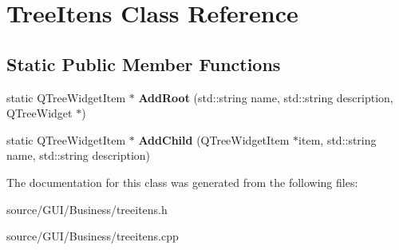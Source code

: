 \section{Tree\+Itens Class Reference}
\label{class_tree_itens}
\subsection*{Static Public Member Functions}
\begin{DoxyCompactItemize}
\item 
static Q\+Tree\+Widget\+Item $\ast$ {\bfseries Add\+Root} (std\+::string name, std\+::string description, Q\+Tree\+Widget $\ast$)\label{class_tree_itens_a37c583b5c2dd4c0adc8a4dd8bf4edada}

\item 
static Q\+Tree\+Widget\+Item $\ast$ {\bfseries Add\+Child} (Q\+Tree\+Widget\+Item $\ast$item, std\+::string name, std\+::string description)\label{class_tree_itens_ae8d262ab6397a1850e133434547ae07d}

\end{DoxyCompactItemize}


The documentation for this class was generated from the following files\+:\begin{DoxyCompactItemize}
\item 
source/\+G\+U\+I/\+Business/treeitens.\+h\item 
source/\+G\+U\+I/\+Business/treeitens.\+cpp\end{DoxyCompactItemize}
